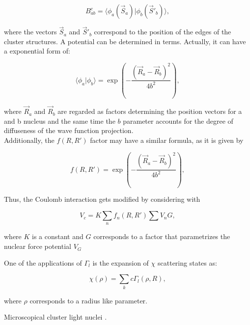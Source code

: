 \documentclass[openany]{book}
\begin{document}
\begin{equation}\label{eq:micro_cluster_overlapping}
	B^{c}_{ab} = \langle  \phi_a (\vec S_a)| \phi_b(\vec S'_b) \rangle ,
\end{equation}

where the vectors $\vec S_a$ and $\vec S'_b$ correspond to the position of the edges of the cluster structures. A potential can be determined in terms. Actually, it can have a exponential form of: 

\begin{equation}\label{eq:micro_cluster_overlapping_exp}
	\langle \phi_a | \phi_b \rangle  = \exp {\left(-\frac{(\vec R_a - \vec R_b)^2}{4b^2}\right)},
\end{equation}

where $\vec R_a$ and $\vec R_b$ are regarded as factors determining the position vectors for a and b nucleus and the same time the $b$ parameter accounts for the degree of diffuseness of the wave function projection. \\

Additionally, the $f(R, R')$ factor may have a similar formula, as it is given by

\begin{equation}\label{eq:micro_cluster_overlapping_f}
	f(R, R') = \exp {\left(-\frac{(\vec R_a - \vec R_b)^2}{4b^2}\right)},
\end{equation}

Thus, the Coulomb interaction gets modified by considering with 

\begin{equation}\label{eq:micro_cluster_overlapping_coulomb}
	V_c = K \sum_n f_n(R, R') \sum V_n G,
\end{equation}

where $K$ is a constant and $G$ corresponds to a factor that parametrizes the nuclear force potential $V_G$


One of the applications of $\Gamma_l$ is the expansion of $\chi $ scattering states as: 

 \begin{equation}\label{eq:micro_cluster_scattering}
	\chi(\rho) = \sum_{k} c \Gamma_l(\rho, R),
 \end{equation}

where $\rho$ corresponds to a radius like parameter.



Microscopical cluster light nuclei \cite{freer_horiuchi_kanada-enyo_lee_meisner_2018}. \\
\end{document}
